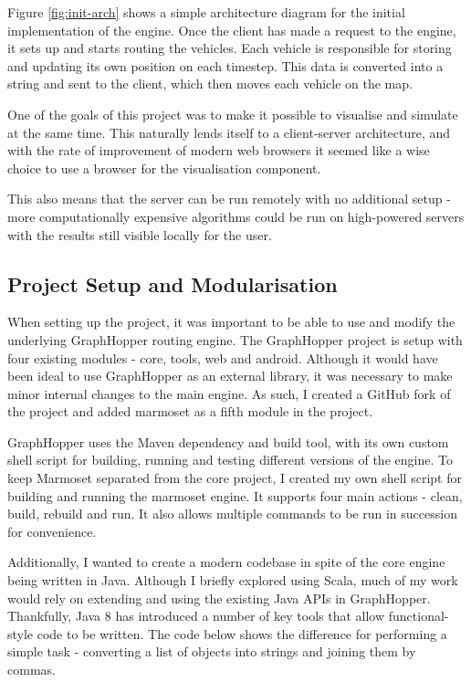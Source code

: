 \documentclass[ %
                    author={Alexander Hill},
                supervisor={Dr. Benjamin Sach},
                    degree={MEng},
                     title={MARMOSET: Multi Agent Real-time Multi-core Online
                     Simulation for Efficient Transportation},
                  subtitle={},
                      type={research},
                      year={2016} ]{dissertation}
\begin{document}
Figure \ref{fig:init-arch} shows a simple architecture diagram for the initial
implementation of the engine. Once the client has made a request to the engine,
it sets up and starts routing the vehicles. Each vehicle is responsible for
storing and updating its own position on each timestep. This data is converted
into a string and sent to the client, which then moves each vehicle on the map.

One of the goals of this project was to make it possible to visualise and
simulate at the same time. This naturally lends itself to a client-server
architecture, and with the rate of improvement of modern web browsers it seemed
like a wise choice to use a browser for the visualisation component.

This also means that the server can be run remotely with no additional setup -
more computationally expensive algorithms could be run on high-powered servers
with the results still visible locally for the user.

\subsection{Project Setup and Modularisation}

When setting up the project, it was important to be able to use and modify the
underlying GraphHopper routing engine. The GraphHopper project is setup with
four existing modules - core, tools, web and android. Although it would have
been ideal to use GraphHopper as an external library, it was necessary to make
minor internal changes to the main engine. As such, I created a GitHub fork of
the project and added marmoset as a fifth module in the project.

GraphHopper uses the Maven dependency and build tool, with its own custom shell
script for building, running and testing different versions of the engine. To
keep Marmoset separated from the core project, I created my own shell script for
building and running the marmoset engine. It supports four main actions - clean,
build, rebuild and run. It also allows multiple commands to be run in succession
for convenience.

Additionally, I wanted to create a modern codebase in spite of the core engine
being written in Java. Although I briefly explored using Scala, much of my work
would rely on extending and using the existing Java APIs in GraphHopper.
Thankfully, Java 8 has introduced a number of key tools that allow
functional-style code to be written. The code below shows the difference for
performing a simple task - converting a list of objects into strings and joining
them by commas.
\end{document}
